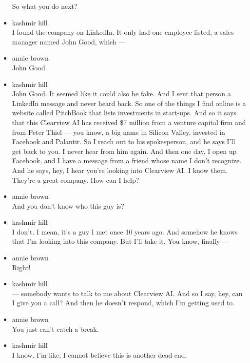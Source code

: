 \begin{itemize}
  So what you do next?
\item
  kashmir hill\\
  I found the company on LinkedIn. It only had one employee listed, a
  sales manager named John Good, which ---
\item
  annie brown\\
  John Good.
\item
  kashmir hill\\
  John Good. It seemed like it could also be fake. And I sent that
  person a LinkedIn message and never heard back. So one of the things I
  find online is a website called PitchBook that lists investments in
  start-ups. And so it says that this Clearview AI has received \$7
  million from a venture capital firm and from Peter Thiel --- you know,
  a big name in Silicon Valley, invested in Facebook and Palantir. So I
  reach out to his spokesperson, and he says I'll get back to you. I
  never hear from him again. And then one day, I open up Facebook, and I
  have a message from a friend whose name I don't recognize. And he
  says, hey, I hear you're looking into Clearview AI. I know them.
  They're a great company. How can I help?
\item
  annie brown\\
  And you don't know who this guy is?
\item
  kashmir hill\\
  I don't. I mean, it's a guy I met once 10 years ago. And somehow he
  knows that I'm looking into this company. But I'll take it. You know,
  finally ---
\item
  annie brown\\
  Right!
\item
  kashmir hill\\
  --- somebody wants to talk to me about Clearview AI. And so I say,
  hey, can I give you a call? And then he doesn't respond, which I'm
  getting used to.
\item
  annie brown\\
  You just can't catch a break.
\item
  kashmir hill\\
  I know. I'm like, I cannot believe this is another dead end.


\end{itemize}
